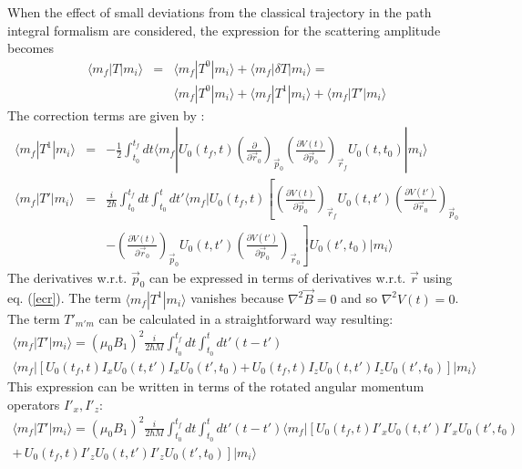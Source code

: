 \documentclass[aps,preprint,prl]{revtex4-2}
\newcommand{\ba}{\begin{eqnarray}}
\newcommand{\ea}{\end{eqnarray}}
\begin{document}
When the effect of small deviations from the classical trajectory in the path
integral formalism are considered, the expression for the scattering amplitude
becomes
\ba
\langle m_f|T|m_i \rangle & = & \langle m_f|T^0|m_i \rangle + \langle m_f|\delta T|m_i \rangle =  \nonumber \\ 
            &  & \langle m_f|T^0|m_i \rangle + \langle m_f|T^1|m_i \rangle + \langle m_f|T'|m_i \rangle
\ea
The  correction terms are given  by \cite{2}:
\ba
\langle m_f|T^1|m_i \rangle & = &  -\frac{1}{2} \int^{t_f}_{t_0} dt 
\langle m_f|U_0(t_f,t) \left( \frac{\partial}{\partial \vec{r}_0} 
\right)_{\vec{p}_0} 
\left( \frac{\partial V(t)}{\partial\vec{p}_0} \right)_{\vec{r}_f} 
{U}_0(t,t_0)|m_i \rangle  \label{t1} \\
\langle m_f|T'|m_i \rangle& = & \frac{i}{2 \hbar} \int^{t_f}_{t_0} dt \int_{t_0}^t dt'
\langle m_f|{U}_0(t_f,t) \left[ \left (\frac{ \partial V(t)}{ \partial \vec{p}_0} 
\right)_{\vec{r}_f} U_0(t,t') \left( \frac{ \partial V(t')}
{ \partial \vec{r}_0} \right)_{\vec{p}_0} \right. \nonumber \\
 &  &  -   \left. \left( \frac{\partial V(t)}{\partial \vec{r}_0} 
\right)_{\vec{p}_0} U_0(t,t') 
\left( \frac{\partial V(t')}{\partial \vec{p}_0} 
\right)_{\vec{r}_0}\right] U_0(t',t_0) |m_i \rangle  \label{t'}
\ea
The derivatives w.r.t. $\vec{p}_0$ can be expressed in terms of derivatives
w.r.t. $\vec r$ using eq. (\ref{ecr}).
The term $\langle m_f|T^1|m_i \rangle$ vanishes because $ \nabla^2 \vec{B} = 0$ and so
$\nabla^2 V(t) =0 $. The  term $T'_{m'm}$ can be calculated in a 
straightforward way resulting:
\begin{multline}
\langle m_f|T'|m_i \rangle = \left( \mu_0 B_1 \right)^2 \frac{i}{2 \hbar M} 
\int^{t_f}_{t_0} dt
\int^{t}_{t_0}dt'(t - t') \\
\langle m_f |\left[ U_0(t_f,t) I_x  U_0(t,t') 
I_x U_0(t', t_0) \right. 
\left. +\,  U_0(t_f,t)I_z U_0(t,t') 
I_z U_0(t',t_0) \right] |m_i \rangle 
\end{multline}
This expression can be written in terms of the rotated angular momentum 
operators $I'_x, I'_z$:
\begin{multline}
\langle m_f|T'|m_i \rangle =  \left( \mu_0 B_1 \right)^2 \frac{i}{2 \hbar M} 
\int^{t_f}_{t_0} dt
\int^{t}_{t_0}dt'(t - t') 
 \langle m_f |\left[ U_0(t_f,t) I'_x U_0(t,t') 
I'_x U_0(t',t_0) \right. \\
   \left. + \, U_0(t_f,t) I'_z U_0(t,t') 
I'_z U_0(t',t_0) \right] |m_i \rangle 
\end{multline}
\end{document}
